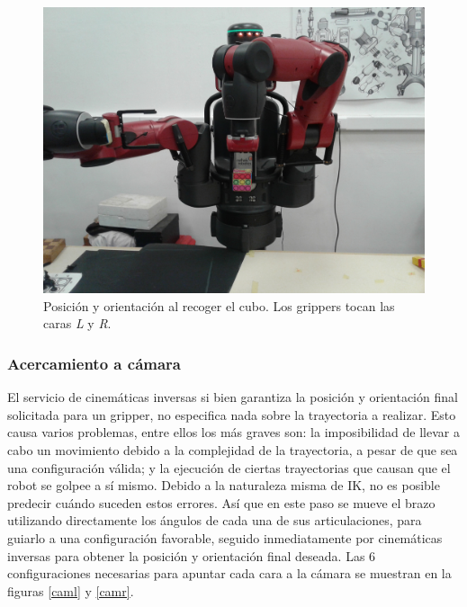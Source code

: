 \begin{figure}[h!]
	\centering
	\includegraphics[scale=0.1]{figures/pick}
	\caption{Posición y orientación al recoger el cubo. Los grippers tocan las caras \textit{L} y \textit{R}.}
	\label{pick}
\end{figure}

\subsubsection{Acercamiento a cámara}
El servicio de cinemáticas inversas si bien garantiza la posición y orientación final solicitada para un gripper, no especifica nada sobre la trayectoria a realizar. Esto causa varios problemas, entre ellos los más graves son: la imposibilidad de llevar a cabo un movimiento debido a la complejidad de la trayectoria, a pesar de que sea una configuración válida; y la ejecución de ciertas trayectorias que causan que el robot se golpee a sí mismo. Debido a la naturaleza misma de IK, no es posible predecir cuándo suceden estos errores. Así que en este paso se mueve el brazo utilizando directamente los ángulos de cada una de sus articulaciones, para guiarlo a una configuración favorable, seguido inmediatamente por cinemáticas inversas para obtener la posición y orientación final deseada. Las 6 configuraciones necesarias para apuntar cada cara a la cámara se muestran en la figuras \ref{caml} y \ref{camr}.

